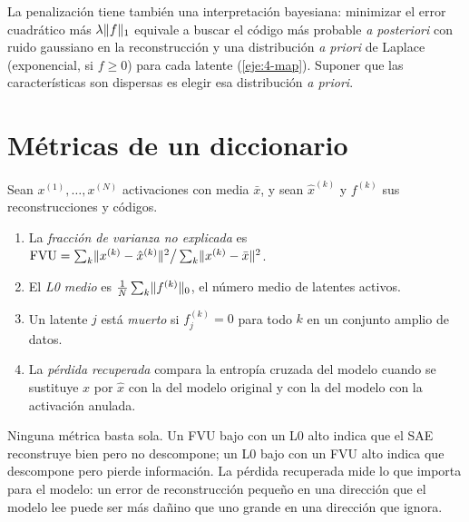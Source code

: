 La penalización tiene también una interpretación bayesiana: minimizar el error cuadrático más $\lambda\lVert f\rVert_1$ equivale a buscar el código más probable \emph{a posteriori} con ruido gaussiano en la reconstrucción y una distribución \emph{a priori} de Laplace (exponencial, si $f\ge 0$) para cada latente (\cref{eje:4-map}). Suponer que las características son dispersas es elegir esa distribución \emph{a priori}.

\section{Métricas de un diccionario}

\begin{definicion}\label{def:metricas}
Sean $x^{(1)},\dots,x^{(N)}$ activaciones con media $\bar x$, y sean $\hat x^{(k)}$ y $f^{(k)}$ sus reconstrucciones y códigos.
\begin{enumerate}
  \item La \emph{fracción de varianza no explicada} es $\operatorname{FVU}=\sum_k\lVert x^{(k)}-\hat x^{(k)}\rVert^{2}\big/\sum_k\lVert x^{(k)}-\bar x\rVert^{2}$.
  \item El \emph{L0 medio} es $\frac1N\sum_k\lVert f^{(k)}\rVert_0$, el número medio de latentes activos.
  \item Un latente $j$ está \emph{muerto} si $f^{(k)}_j=0$ para todo $k$ en un conjunto amplio de datos.
  \item La \emph{pérdida recuperada} compara la entropía cruzada del modelo cuando se sustituye $x$ por $\hat x$ con la del modelo original y con la del modelo con la activación anulada.
\end{enumerate}
\end{definicion}

Ninguna métrica basta sola. Un FVU bajo con un L0 alto indica que el SAE reconstruye bien pero no descompone; un L0 bajo con un FVU alto indica que descompone pero pierde información. La pérdida recuperada mide lo que importa para el modelo: un error de reconstrucción pequeño en una dirección que el modelo lee puede ser más dañino que uno grande en una dirección que ignora.

